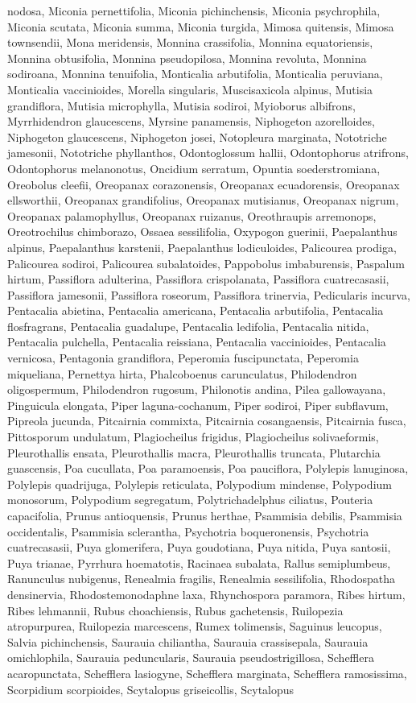 \documentclass[]{article}
\begin{document}
nodosa, Miconia pernettifolia, Miconia pichinchensis, Miconia psychrophila, Miconia scutata, Miconia summa, Miconia turgida, Mimosa quitensis, Mimosa townsendii, Mona meridensis, Monnina crassifolia, Monnina equatoriensis, Monnina obtusifolia, Monnina pseudopilosa, Monnina revoluta, Monnina sodiroana, Monnina tenuifolia, Monticalia arbutifolia, Monticalia peruviana, Monticalia vaccinioides, Morella singularis, Muscisaxicola alpinus, Mutisia grandiflora, Mutisia microphylla, Mutisia sodiroi, Myioborus albifrons, Myrrhidendron glaucescens, Myrsine panamensis, Niphogeton azorelloides, Niphogeton glaucescens, Niphogeton josei, Notopleura marginata, Nototriche jamesonii, Nototriche phyllanthos, Odontoglossum hallii, Odontophorus atrifrons, Odontophorus melanonotus, Oncidium serratum, Opuntia soederstromiana, Oreobolus cleefii, Oreopanax corazonensis, Oreopanax ecuadorensis, Oreopanax ellsworthii, Oreopanax grandifolius, Oreopanax mutisianus, Oreopanax nigrum, Oreopanax palamophyllus, Oreopanax ruizanus, Oreothraupis arremonops, Oreotrochilus chimborazo, Ossaea sessilifolia, Oxypogon guerinii, Paepalanthus alpinus, Paepalanthus karstenii, Paepalanthus lodiculoides, Palicourea prodiga, Palicourea sodiroi, Palicourea subalatoides, Pappobolus imbaburensis, Paspalum hirtum, Passiflora adulterina, Passiflora crispolanata, Passiflora cuatrecasasii, Passiflora jamesonii, Passiflora roseorum, Passiflora trinervia, Pedicularis incurva, Pentacalia abietina, Pentacalia americana, Pentacalia arbutifolia, Pentacalia flosfragrans, Pentacalia guadalupe, Pentacalia ledifolia, Pentacalia nitida, Pentacalia pulchella, Pentacalia reissiana, Pentacalia vaccinioides, Pentacalia vernicosa, Pentagonia grandiflora, Peperomia fuscipunctata, Peperomia miqueliana, Pernettya hirta, Phalcoboenus carunculatus, Philodendron oligospermum, Philodendron rugosum, Philonotis andina, Pilea gallowayana, Pinguicula elongata, Piper laguna-cochanum, Piper sodiroi, Piper subflavum, Pipreola jucunda, Pitcairnia commixta, Pitcairnia cosangaensis, Pitcairnia fusca, Pittosporum undulatum, Plagiocheilus frigidus, Plagiocheilus solivaeformis, Pleurothallis ensata, Pleurothallis macra, Pleurothallis truncata, Plutarchia guascensis, Poa cucullata, Poa paramoensis, Poa pauciflora, Polylepis lanuginosa, Polylepis quadrijuga, Polylepis reticulata, Polypodium mindense, Polypodium monosorum, Polypodium segregatum, Polytrichadelphus ciliatus, Pouteria capacifolia, Prunus antioquensis, Prunus herthae, Psammisia debilis, Psammisia occidentalis, Psammisia sclerantha, Psychotria boqueronensis, Psychotria cuatrecasasii, Puya glomerifera, Puya goudotiana, Puya nitida, Puya santosii, Puya trianae, Pyrrhura hoematotis, Racinaea subalata, Rallus semiplumbeus, Ranunculus nubigenus, Renealmia fragilis, Renealmia sessilifolia, Rhodospatha densinervia, Rhodostemonodaphne laxa, Rhynchospora paramora, Ribes hirtum, Ribes lehmannii, Rubus choachiensis, Rubus gachetensis, Ruilopezia atropurpurea, Ruilopezia marcescens, Rumex tolimensis, Saguinus leucopus, Salvia pichinchensis, Saurauia chiliantha, Saurauia crassisepala, Saurauia omichlophila, Saurauia peduncularis, Saurauia pseudostrigillosa, Schefflera acaropunctata, Schefflera lasiogyne, Schefflera marginata, Schefflera ramosissima, Scorpidium scorpioides, Scytalopus griseicollis, Scytalopus 
\end{document}
